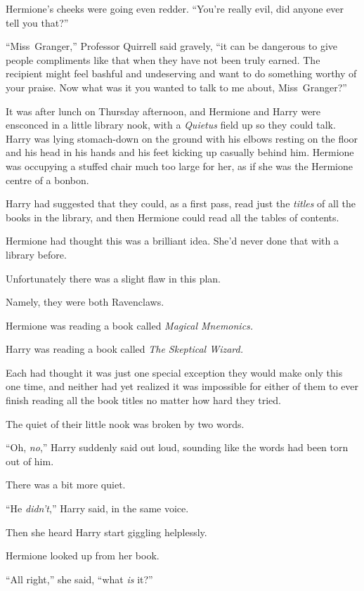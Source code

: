 Hermione’s cheeks were going even redder. “You’re really evil, did anyone ever tell you that?”

“Miss~Granger,” Professor Quirrell said gravely, “it can be dangerous to give people compliments like that when they have not been truly earned. The recipient might feel bashful and undeserving and want to do something worthy of your praise. Now what was it you wanted to talk to me about, Miss~Granger?”

\later

It was after lunch on Thursday afternoon, and Hermione and Harry were ensconced in a little library nook, with a \emph{Quietus} field up so they could talk. Harry was lying stomach-down on the ground with his elbows resting on the floor and his head in his hands and his feet kicking up casually behind him. Hermione was occupying a stuffed chair much too large for her, as if she was the Hermione centre of a bonbon.

Harry had suggested that they could, as a first pass, read just the \emph{titles} of all the books in the library, and then Hermione could read all the tables of contents.

Hermione had thought this was a brilliant idea. She’d never done that with a library before.

Unfortunately there was a slight flaw in this plan.

Namely, they were both Ravenclaws.

Hermione was reading a book called \emph{Magical Mnemonics.}

Harry was reading a book called \emph{The Skeptical Wizard.}

Each had thought it was just one special exception they would make only this one time, and neither had yet realized it was impossible for either of them to ever finish reading all the book titles no matter how hard they tried.

The quiet of their little nook was broken by two words.

“Oh, \emph{no},” Harry suddenly said out loud, sounding like the words had been torn out of him.

There was a bit more quiet.

“He \emph{didn’t},” Harry said, in the same voice.

Then she heard Harry start giggling helplessly.

Hermione looked up from her book.

“All right,” she said, “what \emph{is} it?”

